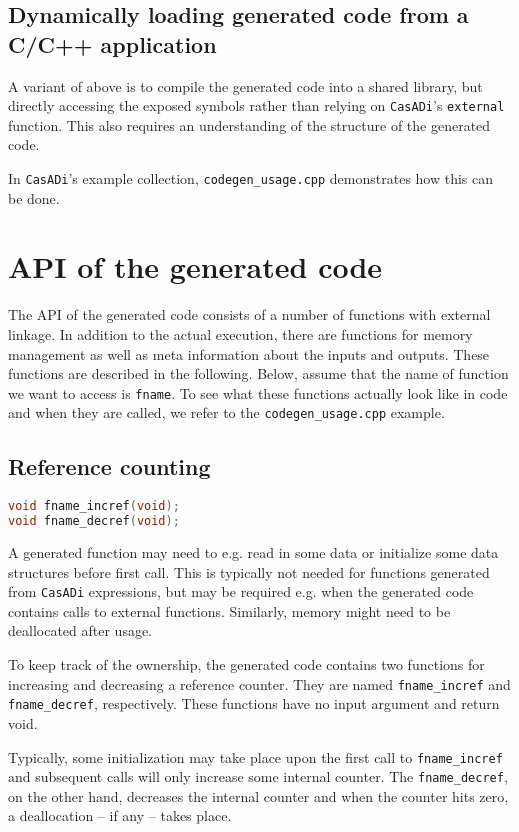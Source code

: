 \documentclass[a4paper,12pt]{book}
\newcommand{\CasADi}{\texttt{CasADi}\xspace}
\begin{document}
\subsection*{Dynamically loading generated code from a C/C++ application}
A variant of above is to compile the generated code into a shared library,
but directly accessing the exposed symbols rather than relying on \CasADi's
\texttt{external} function. This also requires an understanding of the structure
of the generated code.

In \CasADi's example collection, \verb|codegen_usage.cpp| demonstrates how this
can be done.

\section{API of the generated code} \label{sec:c_api}
The API of the generated code consists of a number of functions with external
linkage. In addition to the actual execution, there are functions for memory
management as well as meta information about the inputs and outputs.
These functions are described in the following. Below, assume that the name of
function we want to access is \texttt{fname}. To see what these functions actually
look like in code and when they are called, we refer to the
\verb|codegen_usage.cpp| example.

\subsection*{Reference counting}
\begin{lstlisting}[language=C]
void fname_incref(void);
void fname_decref(void);
\end{lstlisting}

A generated function may need to e.g. read in some data or initialize some data
structures before first call. This is typically not needed for functions generated
from \CasADi expressions, but may be required e.g. when the generated code contains
calls to external functions. Similarly, memory might need to be deallocated
after usage.

To keep track of the ownership, the generated code contains two functions for
increasing and decreasing a reference counter.
They are named \verb|fname_incref| and \verb|fname_decref|, respectively. These
functions have no input argument and return void.

Typically, some initialization may take place upon the first call to
\verb|fname_incref| and subsequent calls will only increase some internal counter.
The \verb|fname_decref|, on the other hand, decreases the internal counter and
when the counter hits zero, a deallocation -- if any -- takes place.
\end{document}
